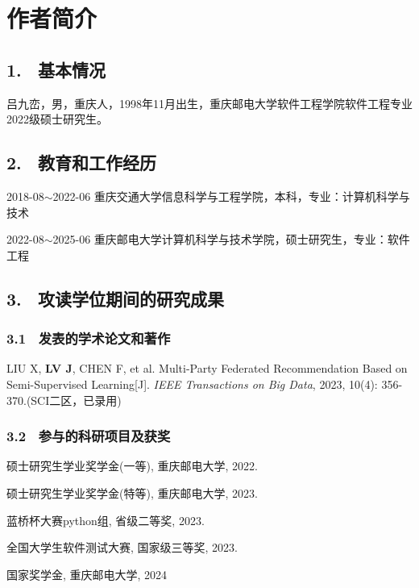 \specialsectioning


\chapter{作者简介}
\thispagestyle{others}
\pagestyle{others}
\xiaosi

\section{1. \ 基本情况}
吕九峦，男，重庆人，1998年11月出生，重庆邮电大学软件工程学院软件工程专业2022级硕士研究生。

\section{2. \ 教育和工作经历}
2018-08$\sim$2022-06 重庆交通大学信息科学与工程学院，本科，专业：计算机科学与技术

2022-08$\sim$2025-06 重庆邮电大学计算机科学与技术学院，硕士研究生，专业：软件工程
%
\section{3. \ 攻读学位期间的研究成果}

\vspace{0.2cm}


\subsection{3.1 \ 发表的学术论文和著作}
\begin{enumerate}[label={[{\arabic*}]}, leftmargin=2em]
	\item  LIU X, \textbf{LV J}, CHEN F, et al. Multi-Party Federated Recommendation Based on Semi-Supervised Learning[J]. \textit{IEEE Transactions on Big Data}, 2023, 10(4): 356-370.(SCI二区，已录用)
\end{enumerate}


\subsection{3.2 \ 参与的科研项目及获奖}
\begin{enumerate}[label={[{\arabic*}]}, leftmargin=2em, itemsep=0pt, parsep=0pt, topsep=0pt]
	\item  硕士研究生学业奖学金(一等), 重庆邮电大学, 2022.
	\item  硕士研究生学业奖学金(特等), 重庆邮电大学, 2023.
	\item  蓝桥杯大赛python组, 省级二等奖, 2023.
	\item  全国大学生软件测试大赛, 国家级三等奖, 2023.
	\item  国家奖学金, 重庆邮电大学, 2024
\end{enumerate}






